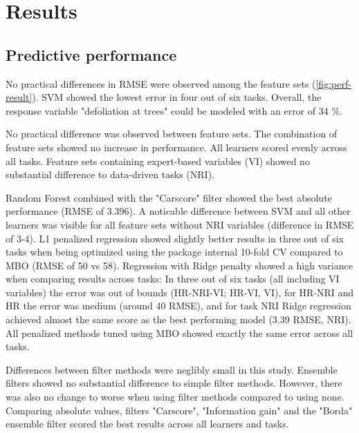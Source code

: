 \documentclass[letterpaper, journal]{IEEEtran}
\begin{document}
\section{Results}

\subsection{Predictive performance}

\noindent No practical differences in RMSE were observed among the feature sets (\autoref{fig:perf-result}).
SVM showed the lowest error in four out of six tasks.
Overall, the response variable "defoliation at trees" could be modeled with an error of 34 \%.

No practical difference was observed between feature sets.
The combination of feature sets showed no increase in performance.
All learners scored evenly across all tasks.
Feature sets containing expert-based variables (VI) showed no substantial difference to data-driven tasks (NRI).

Random Forest combined with the "Carscore" filter showed the best absolute performance (RMSE of 3.396).
A noticable difference between SVM and all other learners was visible for all feature sets without NRI variables (difference in RMSE of 3-4).
L1 penalized regression showed slightly better results in three out of six tasks when being optimized using the package internal 10-fold CV compared to MBO (RMSE of 50 vs 58).
Regression with Ridge penalty showed a high variance when comparing results across tasks: In three out of six tasks (all including VI variables) the error was out of bounds (HR-NRI-VI; HR-VI, VI), for HR-NRI and HR the error was medium (around 40 RMSE), and for task NRI Ridge regression achieved almost the same score as the best performing model (3.39 RMSE, NRI).
All penalized methods tuned using MBO showed exactly the same error across all tasks.

Differences between filter methods were neglibly small in this study.
Ensemble filters showed no substantial difference to simple filter methods.
However, there was also no change to worse when using filter methods compared to using none.
Comparing absolute values, filters "Carscore", "Information gain" and the "Borda" ensemble filter scored the best results across all learners and tasks.
\end{document}
